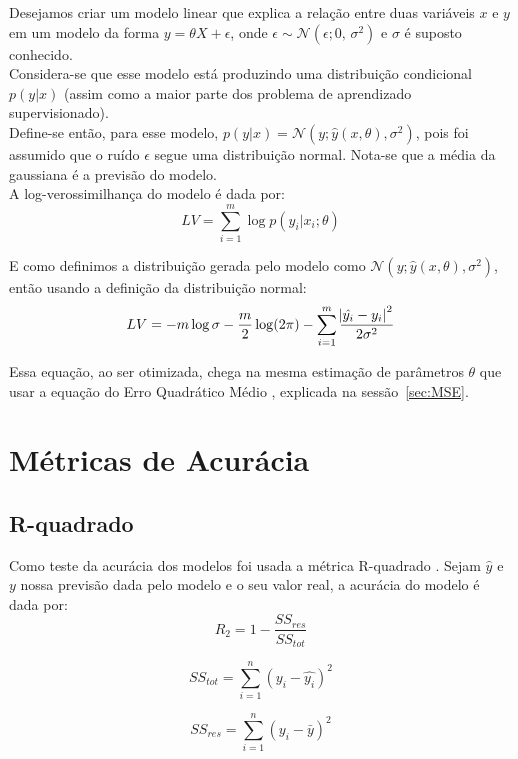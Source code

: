Desejamos criar um modelo linear que explica a relação entre duas variáveis
$x$ e $y$ em um modelo da forma $y = \theta X + \epsilon$, onde $\epsilon
\sim \mathcal{N}(\epsilon;0,\,\sigma^2)$ e $\sigma$ é suposto conhecido.\\

Considera-se que esse modelo está produzindo uma distribuição condicional
$p(y|x)$ (assim como a maior parte dos problema de aprendizado supervisionado). \\ 

Define-se então, para esse modelo, $p(y|x) =
\mathcal{N}(y ; \hat{y}(x,\theta),\sigma^2)$, pois foi assumido que o ruído $\epsilon$
segue uma distribuição normal. Nota-se que a média da gaussiana é a previsão do
modelo. \\

A log-verossimilhança do modelo é dada por: \\

\[ LV =  \sum^m_{i=1}\log p(y_i | x_i ; \theta)\]


E como definimos a distribuição gerada pelo modelo como $
\mathcal{N}(y ; \hat{y}(x,\theta),\sigma^2)$, então usando a definição da
distribuição normal: \\

\[LV = -m \log \sigma - \frac{m}{2} \log (2 \pi) - \sum^m_{i=1}
  \frac{\abs{\hat{y_i}-y_i}^2}{2 \sigma^2} \]

Essa equação, ao ser otimizada, chega na mesma estimação de parâmetros $\theta$
que usar a equação do Erro Quadrático Médio \citep{dlbook}, explicada na sessão~\ref{sec:MSE}.\\

\section{Métricas de Acurácia}

\subsection{R-quadrado}
Como teste da acurácia dos modelos foi usada a métrica R-quadrado \citep{cohen}. Sejam $\hat{y}$ e $y$ nossa previsão dada pelo modelo e o seu valor real, a acurácia do modelo é dada por:\\

\[R_2 = 1 - \frac{SS_{res}}{SS_{tot}}\]

\[SS_{tot} = \sum^n_{i=1} (y_i- \hat{y_i})^2\]

\[SS_{res} = \sum^n_{i=1} (y_i - \bar{y})^2\]

